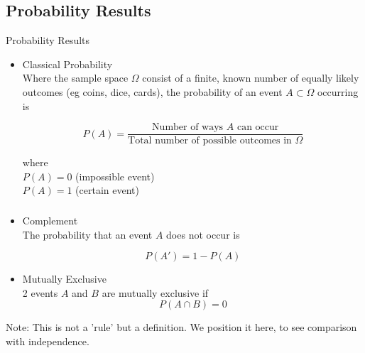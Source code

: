 \documentclass[t,xcolor=pdftex,dvipsnames,table]{beamer}\usepackage[]{graphicx}\usepackage[]{color}
\begin{document}
\subsection[]{Probability Results}
\begin{frame}[fragile]{Probability Results}

\begin{itemize}
\item 
Classical Probability \\
Where the sample space $\Omega$ consist of a finite, known number of equally likely outcomes (eg coins, dice, cards), 
the probability of an event $A \subset \Omega$ occurring is 

\[\boxed{ P(A) = \frac{\mbox{Number of ways $A$ can occur}}{\mbox{Total number of possible outcomes in } \Omega} }  \] 

\vspace{.5cm}
where \\
$P(A) = 0$ (impossible event)  \\
$P(A) = 1$ (certain event) \\
\end{itemize}
\end{frame}
 
\begin{frame}\frametitle{}  
\begin{itemize}
\item
Complement \\
The probability that an event $A$ does not occur is

\[ \boxed{ P(A') = 1 - P(A)  }\]

\vspace{.5cm}
\item Mutually Exclusive \\
2 events $A$ and $B$ are mutually exclusive if
\[ \boxed{ P(A \cap B) = 0 } \]

\vspace{.25cm}
\begin{center}
\end{center}
\end{itemize}

Note: This is not a 'rule' but a definition. We position it here, to see comparison with independence.
\end{frame} 
\end{document}
